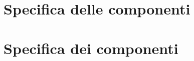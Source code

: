 \section{Specifica delle componenti}
\label{sec:Specifica delle componenti}

\section{Specifica dei componenti}
\label{sec:Specifica dei componenti}



